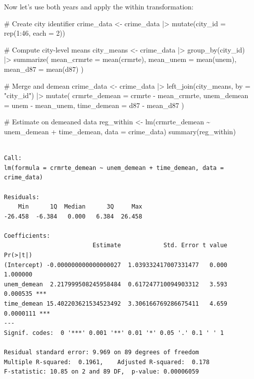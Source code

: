 \documentclass[
  letterpaper,
  DIV=11,
  numbers=noendperiod]{scrreprt}
\newenvironment{Shaded}{\begin{snugshade}}{\end{snugshade}}
\newcommand{\AttributeTok}[1]{\textcolor[rgb]{0.40,0.45,0.13}{#1}}
\newcommand{\CommentTok}[1]{\textcolor[rgb]{0.37,0.37,0.37}{#1}}
\newcommand{\DecValTok}[1]{\textcolor[rgb]{0.68,0.00,0.00}{#1}}
\newcommand{\FunctionTok}[1]{\textcolor[rgb]{0.28,0.35,0.67}{#1}}
\newcommand{\NormalTok}[1]{\textcolor[rgb]{0.00,0.23,0.31}{#1}}
\newcommand{\OtherTok}[1]{\textcolor[rgb]{0.00,0.23,0.31}{#1}}
\newcommand{\SpecialCharTok}[1]{\textcolor[rgb]{0.37,0.37,0.37}{#1}}
\newcommand{\StringTok}[1]{\textcolor[rgb]{0.13,0.47,0.30}{#1}}
\begin{document}
Now let's use both years and apply the within transformation:

\begin{Shaded}
\begin{Highlighting}[]
\CommentTok{\# Create city identifier}
\NormalTok{crime\_data }\OtherTok{\textless{}{-}}\NormalTok{ crime\_data }\SpecialCharTok{|\textgreater{}} 
    \FunctionTok{mutate}\NormalTok{(}\AttributeTok{city\_id =} \FunctionTok{rep}\NormalTok{(}\DecValTok{1}\SpecialCharTok{:}\DecValTok{46}\NormalTok{, }\AttributeTok{each =} \DecValTok{2}\NormalTok{))}

\CommentTok{\# Compute city{-}level means}
\NormalTok{city\_means }\OtherTok{\textless{}{-}}\NormalTok{ crime\_data }\SpecialCharTok{|\textgreater{}} 
    \FunctionTok{group\_by}\NormalTok{(city\_id) }\SpecialCharTok{|\textgreater{}} 
    \FunctionTok{summarize}\NormalTok{(}
        \AttributeTok{mean\_crmrte =} \FunctionTok{mean}\NormalTok{(crmrte),}
        \AttributeTok{mean\_unem =} \FunctionTok{mean}\NormalTok{(unem),}
        \AttributeTok{mean\_d87 =} \FunctionTok{mean}\NormalTok{(d87)}
\NormalTok{    )}

\CommentTok{\# Merge and demean}
\NormalTok{crime\_data }\OtherTok{\textless{}{-}}\NormalTok{ crime\_data }\SpecialCharTok{|\textgreater{}} 
    \FunctionTok{left\_join}\NormalTok{(city\_means, }\AttributeTok{by =} \StringTok{"city\_id"}\NormalTok{) }\SpecialCharTok{|\textgreater{}} 
    \FunctionTok{mutate}\NormalTok{(}
        \AttributeTok{crmrte\_demean =}\NormalTok{ crmrte }\SpecialCharTok{{-}}\NormalTok{ mean\_crmrte,}
        \AttributeTok{unem\_demean =}\NormalTok{ unem }\SpecialCharTok{{-}}\NormalTok{ mean\_unem,}
        \AttributeTok{time\_demean =}\NormalTok{ d87 }\SpecialCharTok{{-}}\NormalTok{ mean\_d87}
\NormalTok{    )}

\CommentTok{\# Estimate on demeaned data}
\NormalTok{reg\_within }\OtherTok{\textless{}{-}} \FunctionTok{lm}\NormalTok{(crmrte\_demean }\SpecialCharTok{\textasciitilde{}}\NormalTok{ unem\_demean }\SpecialCharTok{+}\NormalTok{ time\_demean, }\AttributeTok{data =}\NormalTok{ crime\_data)}
\FunctionTok{summary}\NormalTok{(reg\_within)}
\end{Highlighting}
\end{Shaded}

\begin{verbatim}

Call:
lm(formula = crmrte_demean ~ unem_demean + time_demean, data = crime_data)

Residuals:
    Min      1Q  Median      3Q     Max 
-26.458  -6.384   0.000   6.384  26.458 

Coefficients:
                         Estimate            Std. Error t value  Pr(>|t|)    
(Intercept) -0.000000000000000027  1.039332417007331477   0.000  1.000000    
unem_demean  2.217999508245958484  0.617247710094903312   3.593  0.000535 ***
time_demean 15.402203621534523492  3.306166769286675411   4.659 0.0000111 ***
---
Signif. codes:  0 '***' 0.001 '**' 0.01 '*' 0.05 '.' 0.1 ' ' 1

Residual standard error: 9.969 on 89 degrees of freedom
Multiple R-squared:  0.1961,    Adjusted R-squared:  0.178 
F-statistic: 10.85 on 2 and 89 DF,  p-value: 0.00006059
\end{verbatim}
\end{document}
